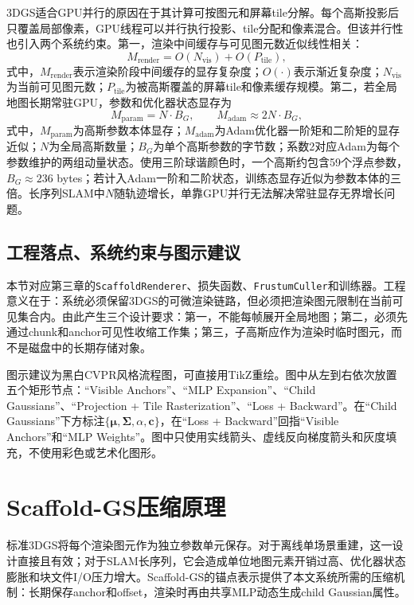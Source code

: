 3DGS适合GPU并行的原因在于其计算可按图元和屏幕tile分解。每个高斯投影后只覆盖局部像素，GPU线程可以并行执行投影、tile分配和像素混合。但该并行性也引入两个系统约束。第一，渲染中间缓存与可见图元数近似线性相关：
\begin{equation}
M_{\mathrm{render}}=O(N_{\mathrm{vis}})+O(P_{\mathrm{tile}}),
\end{equation}
式中，$M_{\mathrm{render}}$表示渲染阶段中间缓存的显存复杂度；$O(\cdot)$表示渐近复杂度；$N_{\mathrm{vis}}$为当前可见图元数；$P_{\mathrm{tile}}$为被高斯覆盖的屏幕tile和像素缓存规模。第二，若全局地图长期常驻GPU，参数和优化器状态显存为
\begin{equation}
M_{\mathrm{param}}=N\cdot B_G,\qquad
M_{\mathrm{adam}}\approx 2N\cdot B_G,
\end{equation}
式中，$M_{\mathrm{param}}$为高斯参数本体显存；$M_{\mathrm{adam}}$为Adam优化器一阶矩和二阶矩的显存近似；$N$为全局高斯数量；$B_G$为单个高斯参数的字节数；系数2对应Adam为每个参数维护的两组动量状态。使用三阶球谐颜色时，一个高斯约包含59个浮点参数，$B_G\approx236$ bytes；若计入Adam一阶和二阶状态，训练态显存近似为参数本体的三倍。长序列SLAM中$N$随轨迹增长，单靠GPU并行无法解决常驻显存无界增长问题。

\subsection{工程落点、系统约束与图示建议}

本节对应第三章的\texttt{ScaffoldRenderer}、损失函数、\texttt{FrustumCuller}和训练器。工程意义在于：系统必须保留3DGS的可微渲染链路，但必须把渲染图元限制在当前可见集合内。由此产生三个设计要求：第一，不能每帧展开全局地图；第二，必须先通过chunk和anchor可见性收缩工作集；第三，子高斯应作为渲染时临时图元，而不是磁盘中的长期存储对象。

图示建议为黑白CVPR风格流程图，可直接用TikZ重绘。图中从左到右依次放置五个矩形节点：``Visible Anchors''、``MLP Expansion''、``Child Gaussians''、``Projection + Tile Rasterization''、``Loss + Backward''。在``Child Gaussians''下方标注$\{\boldsymbol{\mu},\boldsymbol{\Sigma},\alpha,\mathbf{c}\}$，在``Loss + Backward''回指``Visible Anchors''和``MLP Weights''。图中只使用实线箭头、虚线反向梯度箭头和灰度填充，不使用彩色或艺术化图形。

\section{Scaffold-GS压缩原理}

标准3DGS将每个渲染图元作为独立参数单元保存。对于离线单场景重建，这一设计直接且有效；对于SLAM长序列，它会造成单位地图元素开销过高、优化器状态膨胀和块文件I/O压力增大。Scaffold-GS的锚点表示\cite{lu2024scaffoldgs}提供了本文系统所需的压缩机制：长期保存anchor和offset，渲染时再由共享MLP动态生成child Gaussian属性。

